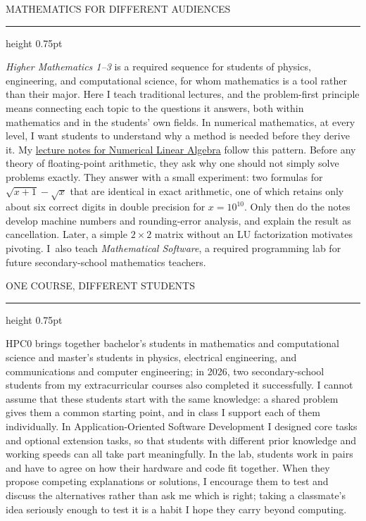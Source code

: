 \documentclass[10pt]{article}
\newcommand{\headsize}{\fontsize{10.5pt}{12.8pt}\selectfont}
\newcommand{\cvsection}[1]{%
  \par\vspace{8pt}%
  {\headsize\bfseries\color{heading}\strut#1\par}%
  \nopagebreak\vspace{1pt}%
  {\color{rule}\hrule height 0.75pt}%
  \nopagebreak\vspace{3pt}%
  \prevdepth=2.9pt\relax
}
\begin{document}
\cvsection{MATHEMATICS FOR DIFFERENT AUDIENCES}

\emph{Higher Mathematics 1–3} is a required sequence for students of physics, engineering, and computational science, for whom mathematics is a tool rather than their major. Here I teach traditional lectures, and the problem-first principle means connecting each topic to the questions it answers, both within mathematics and in the students' own fields. In numerical mathematics, at every level, I want students to understand why a method is needed before they derive it. My \href{https://github.com/michael-lehn/numerical-linear-algebra-lecture-notes}{lecture notes for Numerical Linear Algebra} follow this pattern. Before any theory of floating-point arithmetic, they ask why one should not simply solve problems exactly. They answer with a small experiment: two formulas for $\sqrt{x+1}-\sqrt{x}$ that are identical in exact arithmetic, one of which retains only about six correct digits in double precision for $x=10^{10}$. Only then do the notes develop machine numbers and rounding-error analysis, and explain the result as cancellation. Later, a simple $2\times 2$ matrix without an LU factorization motivates pivoting. I~also teach \emph{Mathematical Software}, a required programming lab for future secondary-school mathematics teachers.

\cvsection{ONE COURSE, DIFFERENT STUDENTS}

HPC0 brings together bachelor's students in mathematics and computational science and master's students in physics, electrical engineering, and communications and computer engineering; in 2026, two secondary-school students from my extracurricular courses also completed it successfully. I cannot assume that these students start with the same knowledge: a shared problem gives them a common starting point, and in class I support each of them individually. In Application-Oriented Software Development I designed core tasks and optional extension tasks, so that students with different prior knowledge and working speeds can all take part meaningfully. In the lab, students work in pairs and have to agree on how their hardware and code fit together. When they propose competing explanations or solutions, I encourage them to test and discuss the alternatives rather than ask me which is right; taking a classmate's idea seriously enough to test it is a habit I hope they carry beyond computing.
\end{document}
